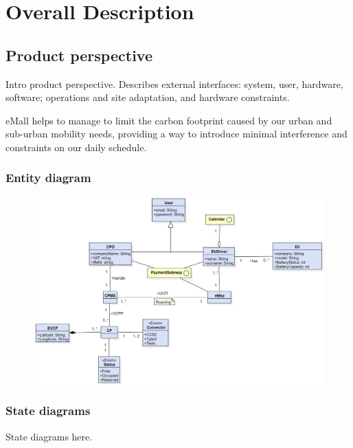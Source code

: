 \section{Overall Description}

\subsection{Product perspective}
Intro product perspective. Describes external interfaces: system,
user, hardware, software;
operations and site adaptation, and
hardware constraints.

eMall helps to manage to limit the carbon footprint caused by our urban and sub-urban mobility needs,
providing a way to introduce minimal interference and constraints on our daily schedule.
\vspace{1cm}
\subsubsection{Entity diagram}
\begin{figure}[H]
      \centering
      \includegraphics[scale=0.6]{src/domain_UML.png}
\end{figure} \vspace{1cm}

\subsubsection{State diagrams}
State diagrams here.

